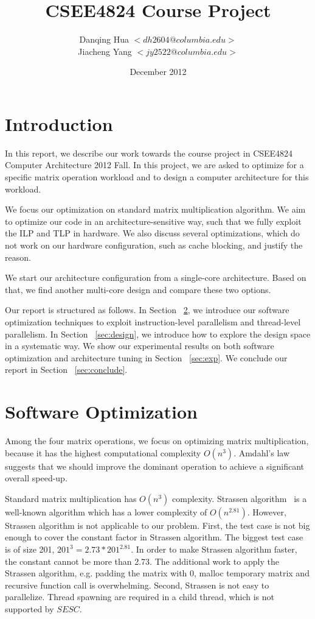 \documentclass[twocolumn,letterpaper,10pt]{article}
\title{CSEE4824 Course Project}
\author{Danqing Hua $<dh2604@columbia.edu>$\\
  Jiacheng Yang $<jy2522@columbia.edu>$}
\date{December 2012}
\begin{document}
\maketitle

\section{Introduction}
\label{sec:intro}

In this report, we describe our work towards the course project in
CSEE4824 Computer Architecture 2012 Fall. In this project, we are asked to optimize for a specific matrix
operation workload and to design a computer architecture for this
workload.

We focus our optimization on standard matrix multiplication
algorithm. We aim to optimize our code in an architecture-sensitive
way, such that we fully exploit the ILP and TLP in hardware. We also discuss
several optimizations, which do not work on
our hardware configuration, such as cache blocking, and justify the reason.

We start our architecture configuration from a single-core architecture. Based on that, we find
another multi-core design and compare these two options.

Our report is structured as follows. In Section ~\ref{sec:software}, we introduce our software optimization
techniques to exploit instruction-level parallelism and
thread-level parallelism. In Section ~\ref{sec:design}, we introduce how to explore the
design space in a systematic way. We show our experimental results on
both software optimization and architecture tuning in Section
~\ref{sec:exp}. We conclude our report in Section ~\ref{sec:conclude}.

\section{Software Optimization}
\label{sec:software}

Among the four matrix operations, we focus on optimizing matrix
multiplication, because it has the highest computational complexity
$O(n^3)$. Amdahl's law suggests that we should improve the dominant
operation to achieve a significant overall speed-up.

Standard matrix multiplication has $O(n^3)$ complexity. Strassen
algorithm~\cite{CLRS} is a well-known algorithm which has a lower
complexity of $O(n^{2.81})$. However, Strassen algorithm is not applicable to our problem. First, the test
case is not big enough to cover the constant factor in Strassen
algorithm. The biggest test case is of size 201, $201^3 = 2.73 *
201^{2.81}$. In order to make Strassen algorithm faster, the
constant cannot be more than 2.73. The additional work
to apply the Strassen algorithm, e.g. padding the matrix with 0, malloc
temporary matrix and recursive function call is overwhelming. Second, Strassen is not
easy to parallelize. Thread spawning are required in a child thread,
which is not supported by $SESC$.
\end{document}
